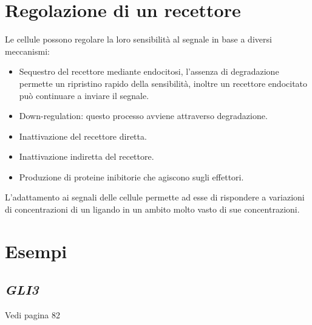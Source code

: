 \section{Regolazione di un recettore}
Le cellule possono regolare la loro sensibilit\`a al segnale in base a diversi meccanismi:
\begin{multicols}{2}
	\begin{itemize}
		\item Sequestro del recettore mediante endocitosi, l'assenza di degradazione permette un ripristino rapido della sensibilit\`a, inoltre un recettore endocitato pu\`o continuare a inviare il segnale.
		\item Down-regulation: questo processo avviene attraverso degradazione.
		\item Inattivazione del recettore diretta.
		\item Inattivazione indiretta del recettore.
		\item Produzione di proteine inibitorie che agiscono sugli effettori.
	\end{itemize}
\end{multicols}
L'adattamento ai segnali delle cellule permette ad esse di rispondere a variazioni di concentrazioni di un ligando in un ambito molto vasto di sue concentrazioni.





\section{Esempi}

	\subsection{\emph{GLI3}}
	Vedi pagina 82

